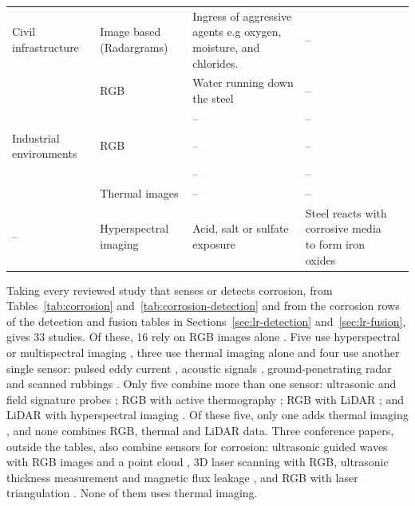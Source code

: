 {\begin{xltabular}{\textwidth}{>{\RaggedRight\arraybackslash}p{2.3cm}>{\RaggedRight\arraybackslash}p{3.0cm}>{\RaggedRight\arraybackslash}X>{\RaggedRight\arraybackslash}p{3.2cm}>{\RaggedRight\arraybackslash}p{1.0cm}}
\midrule
Civil infrastructure & Image based (Radargrams) & Ingress of aggressive agents e.g oxygen, moisture, and chlorides. & -- & \citep{Bui2026} \\
 & RGB & Water running down the steel & -- & \citep{Savino2025} \\
 &  & -- & -- & \citep{Maharjan2025} \\
\midrule
Industrial environments & RGB & -- & -- & \citep{Espinoza2026} \\
 &  & -- & -- & \citep{Nash2022} \\
 & Thermal images & -- & -- & \citep{Doshvarpassand2022} \\
\midrule
-- & Hyperspectral imaging & Acid, salt or sulfate exposure & Steel reacts with corrosive media to form iron oxides & \citep{Lavadiya2022} \\
\end{xltabular}
}


Taking every reviewed study that senses or detects corrosion, from
Tables~\ref{tab:corrosion} and~\ref{tab:corrosion-detection} and from the
corrosion rows of the detection and fusion tables in
Sections~\ref{sec:lr-detection} and~\ref{sec:lr-fusion}, gives 33 studies. Of
these, 16 rely on RGB images alone
\citep{Malashin2024,Mao2026,Espinoza2026,Fu2024,Alvani2026,Imran2025,Yao2019,Nash2022,Savino2025,Maharjan2025,Li2024b,Suzuki2026,Rahman2021,Hu2023,Yu2023,HerndonTien2025}.
Five use hyperspectral or multispectral imaging \citep{Egodawela2025,DeKerf2022,Arias2025,Lavadiya2022,Hernndez-Surez2026}, three use
thermal imaging alone \citep{Elizalde2023,Doshvarpassand2022,Liu2021} and four use another single sensor: pulsed
eddy current \citep{Yang2025}, acoustic signals \citep{Yang2026a}, ground-penetrating radar \citep{Bui2026} and
scanned rubbings \citep{Khodabux2021a}. Only five combine more than one sensor:
ultrasonic and field signature probes \citep{Huang2026a}; RGB with active thermography
\citep{Lim2021}; RGB with LiDAR \citep{Maru2025,PimenteldeFigueiredo2025}; and LiDAR with hyperspectral imaging
\citep{PallasEnguita2025}. Of these five, only one adds thermal imaging \citep{Lim2021}, and none combines
RGB, thermal and LiDAR data. Three conference papers, outside the tables, also
combine sensors for corrosion: ultrasonic guided waves with RGB images and a
point cloud \citep{Ding2025}, 3D laser scanning with RGB, ultrasonic thickness measurement
and magnetic flux leakage \citep{Zheng2025}, and RGB with laser triangulation \citep{Haitz2022}.
None of them uses thermal imaging.

